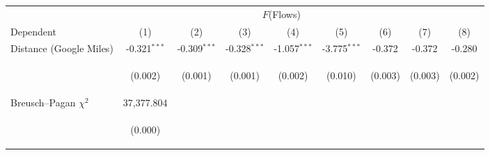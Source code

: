 \begin{center}
\begin{tabular}{lcccccccc}
\hline \noalign{\smallskip} & \multicolumn{7}{c}{$ F$(Flows)} &  \\
Dependent & (1) & (2) & (3) & (4) & (5) & (6) & (7) & (8)\\
\noalign{\smallskip}\hline \noalign{\smallskip}Distance (Google Miles) & -0.321$ ^{***}$ & -0.309$ ^{***}$ & -0.328$ ^{***}$ & -1.057$ ^{***}$ & -3.775$ ^{***}$ & -0.372 & -0.372 & -0.280\\
 & \begin{footnotesize}(0.002)\end{footnotesize} & \begin{footnotesize}(0.001)\end{footnotesize} & \begin{footnotesize}(0.001)\end{footnotesize} & \begin{footnotesize}(0.002)\end{footnotesize} & \begin{footnotesize}(0.010)\end{footnotesize} & \begin{footnotesize}(0.003)\end{footnotesize} & \begin{footnotesize}(0.003)\end{footnotesize} & \begin{footnotesize}(0.002)\end{footnotesize}\\
\noalign{\smallskip}Breusch–Pagan $ \chi^2$ & 37,377.804 &  &  &  &  &  &  & \\
 & \begin{footnotesize}(0.000)\end{footnotesize} & \begin{footnotesize}\end{footnotesize} & \begin{footnotesize}\end{footnotesize} & \begin{footnotesize}\end{footnotesize} & \begin{footnotesize}\end{footnotesize} & \begin{footnotesize}\end{footnotesize} & \begin{footnotesize}\end{footnotesize} & \begin{footnotesize}\end{footnotesize}\\

\end{tabular}
\end{center}
